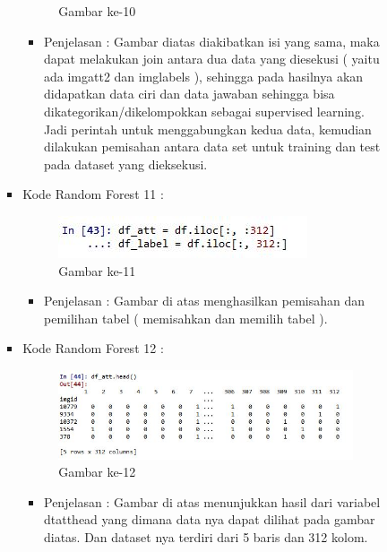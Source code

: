 \begin{enumerate}
\begin{itemize}
\begin{itemize}
\begin{itemize}
\begin{figure}[ht]
\caption{Gambar ke-10}
\label{contoh}
\end{figure}
\par
\begin{itemize}
\item Penjelasan : Gambar diatas diakibatkan isi yang sama, maka dapat melakukan join antara dua data yang diesekusi ( yaitu ada imgatt2 dan imglabels ), sehingga pada hasilnya akan didapatkan data ciri dan data jawaban sehingga bisa dikategorikan/dikelompokkan sebagai supervised learning. Jadi perintah untuk menggabungkan kedua data, kemudian dilakukan pemisahan antara data set untuk training dan test pada dataset yang dieksekusi.
\par
\par
\end{itemize}
\item Kode Random Forest 11 :
\par
\begin{figure}[ht]
\centering
\includegraphics[scale=0.7]{figures/hmm/cod11.jpg}
\caption{Gambar ke-11}
\label{contoh}
\end{figure}
\par
\begin{itemize}
\item Penjelasan : Gambar di atas menghasilkan pemisahan dan pemilihan tabel ( memisahkan dan memilih tabel ). 
\par
\par
\end{itemize}
\item Kode Random Forest 12 :
\par
\begin{figure}[ht]
\centering
\includegraphics[scale=0.7]{figures/hmm/cod12.jpg}
\caption{Gambar ke-12}
\label{contoh}
\end{figure}
\par
\begin{itemize}
\item Penjelasan : Gambar di atas menunjukkan hasil dari variabel dtatthead yang dimana data nya dapat dilihat pada gambar diatas. Dan dataset nya terdiri dari 5 baris dan 312 kolom.

\end{itemize}
\end{itemize}
\end{itemize}
\end{itemize}
\end{enumerate}

